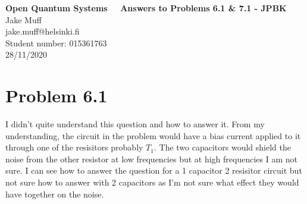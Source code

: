 \documentclass[12pt]{article}
\begin{document}
\normalsize

\baselineskip 14pt

\begin{center}
{\Large {\bf Open Quantum Systems \ \  Answers to Problems 6.1 \& 7.1 - JPBK }}\\
{\large { Jake Muff}}\\
jake.muff@helsinki.fi \\
{Student number: 015361763}\\
{28/11/2020}
\end{center}


\section{Problem 6.1}
I didn't quite understand this question and how to answer it. From my understanding, the circuit in the problem would have a bias current applied to it through one of the resisitors probably $T_1$. The two capacitors would shield the noise from the other resistor at low frequencies but at high frequencies I am not sure. I can see how to answer the question for a 1 capacitor 2 resisitor circuit but not sure how to answer with 2 capacitors as I'm not sure what effect they would have together on the noise. 
\end{document}
